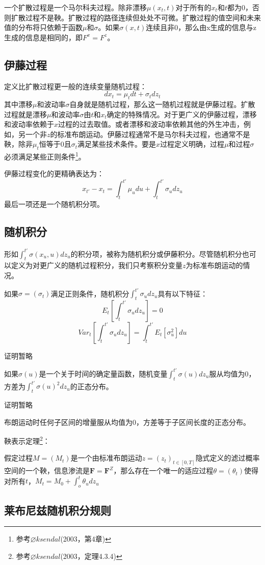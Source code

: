 \documentclass[UTF8]{ctexart}
\newcommand \qd[1] {\begin{qds} {#1} \end{qds}}
\begin{document}
一个扩散过程是一个马尔科夫过程。除非漂移$\mu(x_t,t)$对于所有的$x_t$和$t$都为0，否则扩散过程不是鞅。扩散过程的路径连续但处处不可微。扩散过程的值空间和未来值的分布将只依赖于函数$\mu$和$\sigma$。如果$\sigma(x,t)$连续且非0，那么由x生成的信息与z生成的信息是相同的，即$F^x=F^z$。

\subsection{伊藤过程}

定义比扩散过程更一般的连续变量随机过程：
$$dx_t=\mu_t dt+\sigma_tdz_t$$
其中漂移$\mu$和波动率$\sigma$自身就是随机过程，那么这一随机过程就是伊藤过程。扩散过程就是漂移$\mu$和波动率$\sigma$由$t$和$x_t$确定的特殊情况。对于更广义的伊藤过程，漂移和波动率依赖于$x$过程的过去取值。或者漂移和波动率依赖其他的外生冲击，例如，另一个非$z$的标准布朗运动。伊藤过程通常不是马尔科夫过程，也通常不是鞅，除非$\mu_t$恒等于0且$\sigma_t$满足某些技术条件。要是$x$过程定义明确，过程$\mu$和过程$\sigma$必须满足某些正则条件\footnote{参考$\varnothing ksendal$(2003，第4章)}。

伊藤过程变化的更精确表达为：
$$x_{t'}-x_t=\int_t^{t'}\mu_u du +\int_t^{t'} \sigma_u dz_u$$
最后一项还是一个随机积分项。

\subsection{随机积分}

形如$\int_t^{t'} \sigma(x_u,u)dz_u$的积分项，被称为随机积分或伊藤积分。尽管随机积分也可以定义为对更广义的随机过程积分，我们只考察积分变量$z$为标准布朗运动的情况。

如果$\sigma=(\sigma_t)$满足正则条件，随机积分$\int_t^{t'}\sigma_u dz_u$具有以下特征：
$$E_t[\int_t^{t'}\sigma_u dz_u]=0$$
$$Var_t[\int_t^{t'}\sigma_u dz_u]=\int_t^{t'}E_t[\sigma_u^2]du$$
\qd{证明暂略}

如果$\sigma(u)$是一个关于时间的确定量函数，随机变量$\int_t^{t'}\sigma(u) dz_u$服从均值为0，方差为$\int_t^{t'}\sigma(u)^2 dz_u$的正态分布。
\qd{证明暂略}

布朗运动时任何子区间的增量服从均值为0，方差等于子区间长度的正态分布。

\qd{鞅表示定理\footnote{参考$\varnothing ksendal$(2003，定理4.3.4)}：}假定过程$M=(M_t)$是一个由标准布朗运动$z=(z_t)_{t \in [0,T]}$隐式定义的滤过概率空间的一个鞅，信息渗流是$\textbf{F}=\textbf{F}^Z$，那么存在一个唯一的适应过程$\theta=(\theta_t)$使得对所有$t$，$M_t=M_0+\int_o^t \theta_u dz_u$

\subsection{莱布尼兹随机积分规则}
\end{document}
